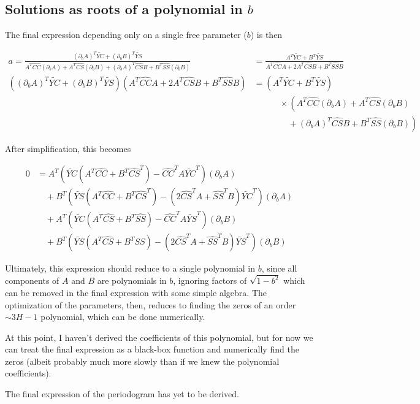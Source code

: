 \documentclass[notitlepage]{article}
\newcommand{\YC}[1][n]{\widetilde{YC}}
\newcommand{\YS}[1][n]{\widetilde{YS}}
\newcommand{\hatCS}[1][nm]{\widehat{CS}}
\newcommand{\hatCC}[1][nm]{\widehat{CC}}
\newcommand{\hatSS}[1][nm]{\widehat{SS}}
\newcommand{\dA}{(\partial_b A)}
\newcommand{\dB}{(\partial_b B)}
\begin{document}
\subsection{Solutions as roots of a polynomial in $b$}
The final expression depending only on a single free parameter ($b$) is then

\begin{align}
a = \frac{\dA^T\YC + \dB^T\YS}{A^T\hatCC \dA + A^T\hatCS\dB + \dA^T\hatCS B + B^T\hatSS \dB} &= \frac{A^T\YC + B^T \YS}{A^T\hatCC A + 2A^T\hatCS B + B^T\hatSS B}\\
\left(\dA^T\YC + \dB^T\YS\right)\left(A^T\hatCC A + 2A^T\hatCS B + B^T\hatSS B\right) &= \left(A^T\YC + B^T \YS\right)\\
																					&\qquad\quad \times \left(A^T\hatCC \dA + A^T\hatCS\dB\right. \\
																					&\qquad\quad\quad + \left.\dA^T\hatCS B + B^T\hatSS \dB\right)
\end{align}

After simplification, this becomes

\begin{align*}
0 &= A^T\left(\YC\left(A^T\hatCC + B^T\hatCS^T\right) - \hatCC^TA\YC^T\right)\dA\\
  &\quad + B^T\left(\YS\left(A^T\hatCC + B^T\hatCS^T\right) - \left(2\hatCS^T A + \hatSS^T B\right)\YC^T\right)\dA\\
  &\quad + A^T\left(\YC\left(A^T\hatCS + B^T\hatSS\right) - \hatCC^T A \YS^T\right)\dB\\
  &\quad + B^T\left(\YS\left(A^T\hatCS + B^T\hatSS\right) - \left(2\hatCS^T A + \hatSS^T B\right)\YS^T\right)\dB
\end{align*}

Ultimately, this expression should reduce to a single polynomial in $b$, since all components of $A$ and $B$ are polynomials in $b$, ignoring factors of $\sqrt{1 - b^2}$ which can be removed in the final expression with some simple algebra. The optimization of the parameters, then, reduces to finding the zeros of an order $\sim 3H - 1$ polynomial, which can be done numerically.

At this point, I haven't derived the coefficients of this polynomial, but for now we can treat the final expression as a black-box function and numerically find the zeros (albeit probably much more slowly than if we knew the polynomial coefficients).

The final expression of the periodogram has yet to be derived.
\end{document}
